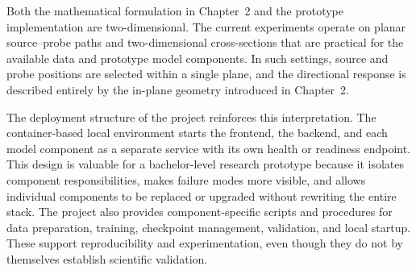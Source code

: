 Both the mathematical formulation in Chapter~2 and the prototype implementation are two-dimensional. The current experiments operate on planar source--probe paths and two-dimensional cross-sections that are practical for the available data and prototype model components. In such settings, source and probe positions are selected within a single plane, and the directional response is described entirely by the in-plane geometry introduced in Chapter~2.

The deployment structure of the project reinforces this interpretation. The container-based local environment starts the frontend, the backend, and each model component as a separate service with its own health or readiness endpoint. This design is valuable for a bachelor-level research prototype because it isolates component responsibilities, makes failure modes more visible, and allows individual components to be replaced or upgraded without rewriting the entire stack. The project also provides component-specific scripts and procedures for data preparation, training, checkpoint management, validation, and local startup. These support reproducibility and experimentation, even though they do not by themselves establish scientific validation.
